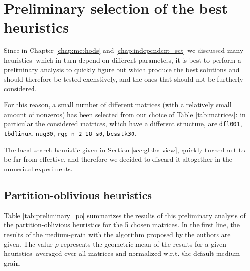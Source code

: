 \section{Preliminary selection of the best heuristics}

Since in Chapter \ref{chap:methods} and \ref{chap:independent_set} we discussed many heuristics, which in turn depend on different parameters, it is best to perform a preliminary analysis to quickly figure out which produce the best solutions and should therefore be tested exenstively, and the ones that should not be furtherly considered.

For this reason, a small number of different matrices (with a relatively small amount of nonzeros) has been selected from our choice of Table \ref{tab:matrices}: in particular the considered matrices, which have a different structure, are \verb|dfl001|, \verb|tbdlinux|, \verb|nug30|, \verb|rgg_n_2_18_s0|, \verb|bcsstk30|.

The local search heuristic given in Section \ref{sec:globalview}, quickly turned out to be far from effective, and therefore we decided to discard it altogether in the numerical experiments. 

\subsection{Partition-oblivious heuristics}

Table \ref{tab:preliminary_po} summarizes the results of this preliminary analysis of the partition-oblivious heuristics for the 5 chosen matrices. In the first line, the results of the medium-grain with the algorithm proposed by the authors are given. The value $\rho$ represents the geometric mean of the results for a given heuristics, averaged over all matrices and normalized w.r.t. the default medium-grain.

